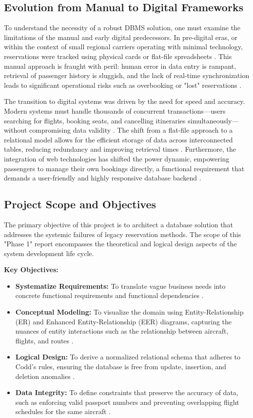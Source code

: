 \documentclass[12pt, a4paper]{article}
\begin{document}
	\subsection{Evolution from Manual to Digital Frameworks}
	To understand the necessity of a robust DBMS solution, one must examine the limitations of the manual and early digital predecessors. In pre-digital eras, or within the context of small regional carriers operating with minimal technology, reservations were tracked using physical cards or flat-file spreadsheets \cite{ref9}. This manual approach is fraught with peril: human error in data entry is rampant, retrieval of passenger history is sluggish, and the lack of real-time synchronization leads to significant operational risks such as overbooking or "lost" reservations \cite{ref10}.
	
	The transition to digital systems was driven by the need for speed and accuracy. Modern systems must handle thousands of concurrent transactions—users searching for flights, booking seats, and cancelling itineraries simultaneously—without compromising data validity \cite{ref11}. The shift from a flat-file approach to a relational model allows for the efficient storage of data across interconnected tables, reducing redundancy and improving retrieval times \cite{ref12}. Furthermore, the integration of web technologies has shifted the power dynamic, empowering passengers to manage their own bookings directly, a functional requirement that demands a user-friendly and highly responsive database backend \cite{ref13}.
	
	\subsection{Project Scope and Objectives}
	The primary objective of this project is to architect a database solution that addresses the systemic failures of legacy reservation methods. The scope of this "Phase 1" report encompasses the theoretical and logical design aspects of the system development life cycle.
	
	\noindent \textbf{Key Objectives:}
	\begin{itemize}
		\item \textbf{Systematize Requirements:} To translate vague business needs into concrete functional requirements and functional dependencies \cite{ref7}.
		\item \textbf{Conceptual Modeling:} To visualize the domain using Entity-Relationship (ER) and Enhanced Entity-Relationship (EER) diagrams, capturing the nuances of entity interactions such as the relationship between aircraft, flights, and routes \cite{ref14}.
		\item \textbf{Logical Design:} To derive a normalized relational schema that adheres to Codd’s rules, ensuring the database is free from update, insertion, and deletion anomalies \cite{ref7, ref15}.
		\item \textbf{Data Integrity:} To define constraints that preserve the accuracy of data, such as enforcing valid passport numbers and preventing overlapping flight schedules for the same aircraft \cite{ref16}.
	\end{itemize}
	
\end{document}
